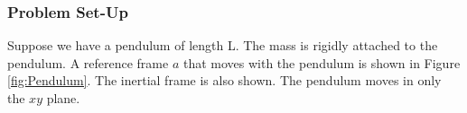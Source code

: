 \documentclass[12pt]{report}
\begin{document}
\subsubsection{Problem Set-Up}
Suppose we have a pendulum of length L. The mass is rigidly attached to the pendulum. A reference frame $a$ that moves with the pendulum is shown in Figure \ref{fig:Pendulum}. The \gls{inertial frame} is also shown. The pendulum moves in only the $xy$ plane.
\begin{figure}[ht]

\centering


\begin{tikzpicture}[x=0.75pt,y=0.75pt,yscale=-1,xscale=1]


\end{tikzpicture}
\end{figure}
\end{document}
